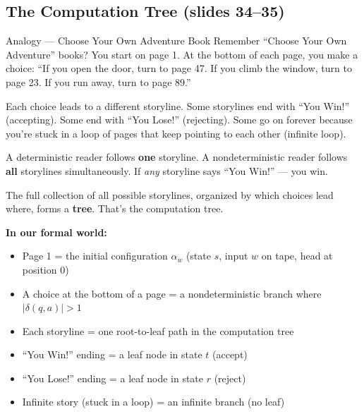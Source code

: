 \subsection{The Computation Tree (slides 34--35)}
\label{subsec:computation-tree}

\begin{notebox}{Analogy --- Choose Your Own Adventure Book}
Remember ``Choose Your Own Adventure'' books? You start on page 1. At the
bottom of each page, you make a choice: ``If you open the door, turn to
page 47. If you climb the window, turn to page 23. If you run away, turn to
page 89.''

Each choice leads to a different storyline. Some storylines end with ``You
Win!'' (accepting). Some end with ``You Lose!'' (rejecting). Some go on
forever because you're stuck in a loop of pages that keep pointing to each
other (infinite loop).

A deterministic reader follows \textbf{one} storyline. A nondeterministic
reader follows \textbf{all} storylines simultaneously. If \emph{any} storyline
says ``You Win!'' --- you win.

The full collection of all possible storylines, organized by which choices
lead where, forms a \textbf{tree}. That's the computation tree.

\textbf{In our formal world:}
\begin{itemize}[nosep]
\item Page 1 = the initial configuration $\alpha_w$ (state $s$, input $w$ on
  tape, head at position 0)
\item A choice at the bottom of a page = a nondeterministic branch where
  $|\delta(q, a)| > 1$
\item Each storyline = one root-to-leaf path in the computation tree
\item ``You Win!'' ending = a leaf node in state $t$ (accept)
\item ``You Lose!'' ending = a leaf node in state $r$ (reject)
\item Infinite story (stuck in a loop) = an infinite branch (no leaf)
\end{itemize}
\end{notebox}

